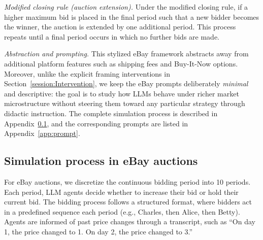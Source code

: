 \documentclass{article} %
\begin{document}
\emph{Modified closing rule (auction extension).}
Under the modified closing rule, if a higher maximum bid is placed in the final period such that a new bidder becomes the winner, the auction is extended by one additional period. This process repeats until a final period occurs in which no further bids are made.

\emph{Abstraction and prompting.}
This stylized eBay framework abstracts away from additional platform features such as shipping fees and Buy-It-Now options. Moreover, unlike the explicit framing interventions in Section~\ref{session:Intervention}, we keep the eBay prompts deliberately \emph{minimal} and descriptive: the goal is to study how LLMs behave under richer market microstructure without steering them toward any particular strategy through didactic instruction. The complete simulation process is described in Appendix~\ref{app:ebay}, and the corresponding prompts are listed in Appendix~\ref{app:prompt}.


\subsection{Simulation process in eBay auctions}\label{app:ebay}

For eBay auctions, we discretize the continuous bidding period into 10 periods. Each period, LLM agents decide whether to increase their bid or hold their current bid. The bidding process follows a structured format, where bidders act in a predefined sequence each period (e.g., Charles, then Alice, then Betty). Agents are informed of past price changes through a transcript, such as ``On day 1, the price changed to 1. On day 2, the price changed to 3.''
\end{document}
